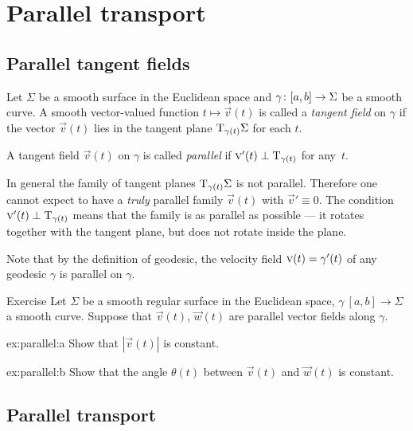 \chapter{Parallel transport}


\section{Parallel tangent fields}

Let $\Sigma$ be a smooth surface in the Euclidean space and $\gamma\:[a,b]\z\to \Sigma$ be a smooth curve.
A smooth vector-valued function $t\mapsto {\vec v}(t)$ is called a \emph{tangent field} on $\gamma$ if
the vector ${\vec v}(t)$ lies in the tangent plane $\mathrm{T}_{\gamma(t)}\Sigma$ for each $t$.

A tangent field ${\vec v}(t)$ on $\gamma$ is called \emph{parallel} if ${\text{\sc{v}}}'(t)\perp\mathrm{T}_{\gamma(t)}$ for any~$t$.

In general the family of tangent planes $\mathrm{T}_{\gamma(t)}\Sigma$ is not parallel.
Therefore one cannot expect to have a {}\emph{truly} parallel family ${\vec v}(t)$ with ${\vec v}'\equiv 0$.
The condition ${\text{\sc{v}}}'(t)\perp\mathrm{T}_{\gamma(t)}$ means that the family is as parallel as possible --- it rotates together with the tangent plane, but does not rotate inside the plane.

Note that by the definition of geodesic, the velocity field ${\vec v}(t)\z=\gamma'(t)$ of any geodesic $\gamma$ is parallel on $\gamma$.

\begin{thm}{Exercise}\label{ex:parallel}
Let $\Sigma$ be a smooth regular surface in the Euclidean space, 
$\gamma\:[a,b]\to \Sigma$ a smooth curve.
Suppose that ${\vec v}(t)$, $\vec w(t)$ are parallel vector fields along $\gamma$.

\begin{subthm}{ex:parallel:a} Show that $|{\vec v}(t)|$ is constant.
\end{subthm}

\begin{subthm}{ex:parallel:b} Show that the angle $\theta(t)$ between ${\vec v}(t)$ and $\vec w(t)$ is constant.
\end{subthm}

\end{thm}

\section{Parallel transport}

